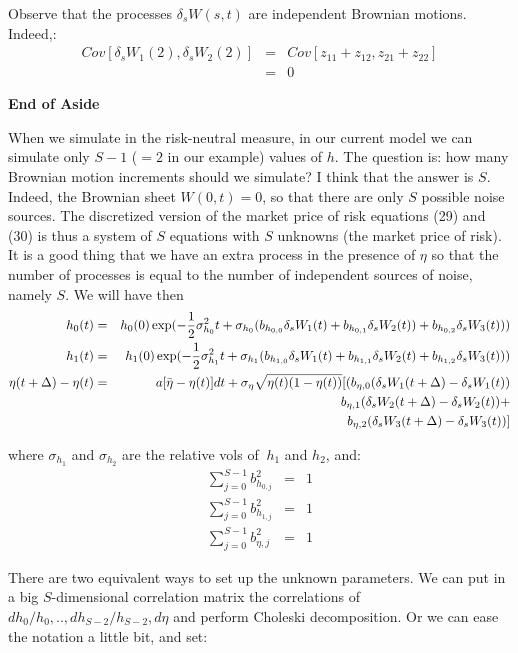 \documentclass{article}
\begin{document}
Observe that the processes $\delta _{s}W(s,t)$ are independent Brownian
motions. Indeed,:%
\begin{eqnarray*}
Cov[\delta _{s}W_{1}(2),\delta _{s}W_{2}(2)]
&=&Cov[z_{11}+z_{12},z_{21}+z_{22}] \\
&=&0
\end{eqnarray*}

\textbf{End of Aside}

When we simulate in the risk-neutral measure, in our current model we can
simulate only $S-1$ ($=2$ in our example) values of $h$. The question is:
how many Brownian motion increments should we simulate? I think that the
answer is $S$. Indeed, the Brownian sheet $W(0,t)=0$, so that there are only 
$S$ possible noise sources. The discretized version of the market price of
risk equations (29) and (30) is thus a system of $S$ equations with $S$
unknowns (the market price of risk). It is a good thing that we have an
extra process in the presence of $\eta $ so that the number of processes is
equal to the number of independent sources of noise, namely $S$. We will
have then%
\begin{eqnarray*}
h_{0}(t) &=&h_{0}(0)\exp (-\frac{1}{2}\sigma _{h_{0}}^{2}t+\sigma
_{h_{0}}(b_{h_{0,0}}\delta _{s}W_{1}(t)+b_{h_{0,1}}\delta
_{s}W_{2}(t))+b_{h_{0,2}}\delta _{s}W_{3}(t))) \\
h_{1}(t) &=&h_{1}(0)\exp (-\frac{1}{2}\sigma _{h_{1}}^{2}t+\sigma
_{h_{1}}(b_{h_{1,0}}\delta _{s}W_{1}(t)+b_{h_{1,1}}\delta
_{s}W_{2}(t)+b_{h_{1,2}}\delta _{s}W_{3}(t))) \\
\eta (t+\Delta )-\eta (t) &=&a[\bar{\eta}-\eta (t)]dt+\sigma _{\eta }\sqrt{%
\eta (t)(1-\eta (t))}[(b_{\eta ,0}(\delta _{s}W_{1}(t+\Delta )-\delta
_{s}W_{1}(t)) \\
&&b_{\eta ,1}(\delta _{s}W_{2}(t+\Delta )-\delta _{s}W_{2}(t))+ \\
&&b_{\eta ,2}(\delta _{s}W_{3}(t+\Delta )-\delta _{s}W_{3}(t))]
\end{eqnarray*}

where $\sigma _{h_{1}}$ and $\sigma _{h_{2}}$ are the relative vols of $\
h_{1}$ and $h_{2}$, and:%
\begin{eqnarray*}
\sum_{j=0}^{S-1}b_{h_{0,j}}^{2} &=&1 \\
\sum_{j=0}^{S-1}b_{h_{1,j}}^{2} &=&1 \\
\sum_{j=0}^{S-1}b_{\eta ,j}^{2} &=&1
\end{eqnarray*}%
\bigskip

There are two equivalent ways to set up the unknown parameters. We can put
in a big $S$-dimensional correlation matrix the correlations of $%
dh_{0}/h_{0},..,dh_{S-2}/h_{S-2},d\eta $ and perform Choleski decomposition.
Or we can ease the notation a little bit, and set:
\end{document}
